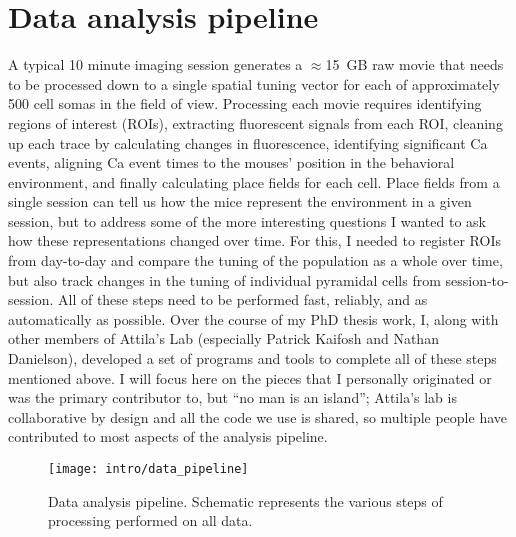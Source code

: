 \section{Data analysis pipeline}
\label{sec:intro:techniques:pipeline}
A typical 10 minute imaging session generates a $\approx$15~GB raw movie that needs to be processed down to a single spatial tuning vector for each of approximately 500 cell somas in the field of view.
Processing each movie requires identifying regions of interest (ROIs), extracting fluorescent signals from each ROI, cleaning up each trace by calculating changes in fluorescence, identifying significant Ca events, aligning Ca event times to the mouses' position in the behavioral environment, and finally calculating place fields for each cell.
Place fields from a single session can tell us how the mice represent the environment in a given session, but to address some of the more interesting questions I wanted to ask how these representations changed over time.
For this, I needed to register ROIs from day-to-day and compare the tuning of the population as a whole over time, but also track changes in the tuning of individual pyramidal cells from session-to-session.
All of these steps need to be performed fast, reliably, and as automatically as possible.
Over the course of my PhD thesis work, I, along with other members of Attila's Lab (especially Patrick Kaifosh and Nathan Danielson), developed a set of programs and tools to complete all of these steps mentioned above.
I will focus here on the pieces that I personally originated or was the primary contributor to, but ``no man is an island''; Attila's lab is collaborative by design and all the code we use is shared, so multiple people have contributed to most aspects of the analysis pipeline.

\begin{figure}
	\centering
	\texttt{[image: intro/data\_pipeline]}
	\caption[Data analysis pipeline]{Data analysis pipeline. Schematic represents the various steps of processing performed on all data.}
	\label{fig:intro:techniques:pipeline}
\end{figure}

